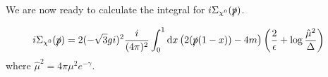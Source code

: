 \documentclass[11pt]{article}
\def\sp{\slashed{p}}
\def\cn{\chi^0}
\def\km{k_{\mu}}
\def\kn{k_{\nu}}
\renewcommand{\d}{\ensuremath{\operatorname{d}\!}}
\begin{document}
We are now ready to calculate the integral for $i\Sigma_{\cn}(\slashed{p})$.

\begin{align}
i\Sigma_{\cn}(\slashed{p})&= 2(-\sqrt{3}gi)^2 \frac{i}{(4\pi)^2}  \int_0^1 \d x \left(2(\sp(1-x))-4m\right) \left(\frac{2}{\epsilon}+\log\frac{\hat{\mu}^2}{\Delta}\right)
\end{align}
where $\hat{\mu}^2=4\pi\mu^2e^{-\gamma}$.


%


%
\end{document}
